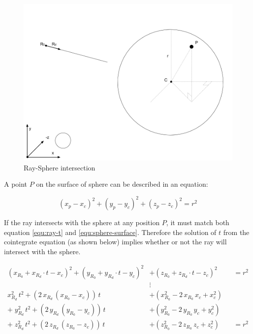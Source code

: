\begin{figure}[H]
\caption{Ray-Sphere intersection}
\label{fig:ray-sphere}
\centering
\includegraphics[width=\linewidth]{Figures/ray-sphere-intersection.png}
\decoRule
\end{figure}

A point $P$ on the surface of sphere can be described in an equation:

\begin{equation}
\label{equ:sphere-surface}
(x_p - x_c)^2 + (y_p - y_c)^2 + (z_p - z_c)^2 = r^2
\end{equation}

If the ray intersects with the sphere at any position $P$, it must match both equation \ref{equ:ray-t} and \ref{equ:sphere-surface}. Therefore the solution of $t$ from the cointegrate equation (as shown below) implies whether or not the ray will intersect with the sphere.

\[
\begin{aligned}
(x_{R_0} + x_{R_d} \cdot t - x_c)^2 + (y_{R_0} + y_{R_d} \cdot t - y_c)^2 &+ (z_{R_0} + z_{R_d} \cdot t - z_c)^2 &&= r^2\\
&\vdots\\
x_{R_d}^2\,t^2 + (2\,x_{R_d}\,(x_{R_0} - x_c))\,t &+ (x_{R_0}^2 - 2\,x_{R_0}\,x_c + x_c^2)\\
+\;y_{R_d}^2\,t^2 + (2\,y_{R_d}\,(y_{R_0} - y_c))\,t &+ (y_{R_0}^2 - 2\,y_{R_0}\,y_c + y_c^2)\\
+\;z_{R_d}^2\,t^2 + (2\,z_{R_d}\,(z_{R_0} - z_c))\,t &+ (z_{R_0}^2 - 2\,z_{R_0}\,z_c + z_c^2) &&= r^2\\
\end{aligned}
\]

